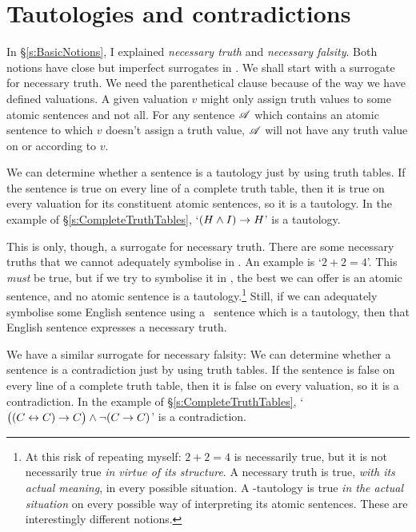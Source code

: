 \section{Tautologies and contradictions}
In §\ref{s:BasicNotions}, I explained \emph{necessary truth} and \emph{necessary falsity}. Both notions have close but imperfect surrogates in \TFL. We shall start with a surrogate for necessary truth.
We need the parenthetical clause because of the way we have defined valuations. A given valuation $v$ might only assign truth values to some atomic sentences and not all. For any sentence $\mathscr{A}$ which contains an atomic sentence to which $v$ doesn't assign a truth value, $\mathscr{A}$ will not have any truth value on or according to $v$.

We can determine whether a sentence is a tautology just by using truth tables. If the sentence is true on every line of a complete truth table, then it is true on every valuation for its constituent atomic sentences, so it is a tautology. In the example of §\ref{s:CompleteTruthTables}, `$(H \wedge I) \rightarrow H$' is a tautology. 



This is only, though, a surrogate for necessary truth. There are some necessary truths that we cannot adequately symbolise in \TFL. An example is `$2 + 2 = 4$'. This \emph{must} be true, but if we try to symbolise it in \TFL, the best we can offer is an atomic sentence, and no atomic sentence is a tautology.\footnote{At this risk of repeating myself: $2+2=4$ is necessarily true, but it is not necessarily true \emph{in virtue of its structure}. A necessary truth is true, \emph{with its actual meaning}, in every possible situation. A \TFL-tautology is true \emph{in the actual situation} on every possible way of interpreting its atomic sentences. These are interestingly different notions.} Still, if we can adequately symbolise some English sentence using a \TFL\ sentence which is a tautology, then that English sentence expresses a necessary truth.

We have a similar surrogate for necessary falsity:
We can determine whether a sentence is a contradiction just by using truth tables. If the sentence is false on every line of a complete truth table, then it is false on every valuation, so it is a contradiction. In the example of §\ref{s:CompleteTruthTables}, `$\bigl( (C\leftrightarrow C) \rightarrow C\bigr)  \wedge \neg(C \rightarrow C)$' is a contradiction.



